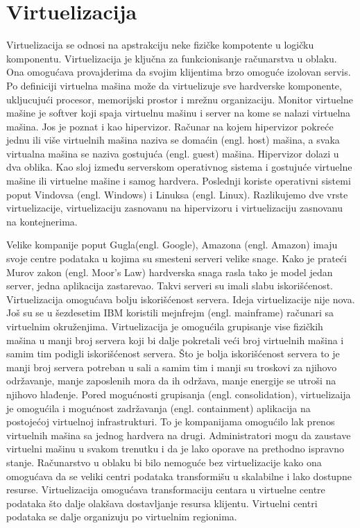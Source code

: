 \documentclass[12pt,oneside]{memoir}
\begin{document}


\section{Virtuelizacija}
Virtuelizacija se odnosi na apstrakciju neke fizičke kompotente u logičku komponentu. Virtuelizacija je ključna za funkcionisanje računarstva u oblaku. Ona omogućava provajderima da svojim klijentima brzo omoguće izolovan servis. Po definiciji virtuelna mašina može da virtuelizuje sve hardverske komponente, ukljucujući procesor, memorijski prostor i mrežnu organizaciju\cite{ve}. Monitor virtuelne mašine je softver koji spaja virtuelnu mašinu i server na kome se nalazi virtuelna mašina. Jos je poznat i kao hipervizor. Računar na kojem hipervizor pokreće jednu ili više virtuelnih mašina naziva se domaćin (engl. host) mašina, a svaka virtualna mašina se naziva gostujuća (engl. guest) mašina. Hipervizor dolazi u dva oblika. Kao sloj između serverskom operativnog sistema i gostujuće virtuelne mašine ili virtuelne mašine i samog hardvera\cite{ve}. Poslednji koriste operativni sistemi poput Vindovsa (engl. Windows) i Linuksa (engl. Linux). Razlikujemo dve vrste virtuelizacije, virtuelizaciju zasnovanu na hipervizoru i virtuelizaciju zasnovanu na kontejnerima.
 
Velike kompanije poput Gugla(engl. Google), Amazona (engl. Amazon) imaju svoje centre podataka u kojima su smesteni serveri velike snage. Kako je prateći Murov zakon (engl. Moor's Law) hardverska snaga rasla tako je model jedan server, jedna aplikacija zastarevao. Takvi serveri su imali slabu iskorišćenost. Virtuelizacija omogućava bolju iskorišćenost servera. Ideja virtuelizacije nije nova. Još su se u šezdesetim IBM koristili mejnfrejm (engl. mainframe) računari sa virtuelnim okruženjima. Virtuelizacija je omogućila grupisanje vise fizičkih mašina u manji broj servera koji bi dalje pokretali veći broj virtuelnih mašina i samim tim podigli iskorišćenost servera. Što je bolja iskorišćenost servera to je manji broj servera potreban u sali a samim tim i manji su troskovi za njihovo održavanje, manje zaposlenih mora da ih održava, manje energije se utroši na njihovo hlađenje. Pored mogućnosti grupisanja (engl. consolidation), virtuelizaija je omogućila i mogućnost zadržavanja (engl. containment) aplikacija na postojećoj virtuelnoj infrastrukturi. To je kompanijama omogućilo lak prenos virtuelnih mašina sa jednog hardvera na drugi. Administratori mogu da zaustave virtuelni mašinu u svakom trenutku i da je lako oporave na prethodno ispravno stanje. Računarstvo u oblaku bi bilo nemoguće bez virtuelizacije kako ona omogućava da se veliki centri podataka transformišu u skalabilne i lako dostupne resurse. Virtuelizacija omogućava transformaciju centara u virtuelne centre podataka što dalje olakšava dostavljanje resursa klijentu. Virtuelni centri podataka se dalje organizuju po virtuelnim regionima\cite{ve}.
\end{document}
